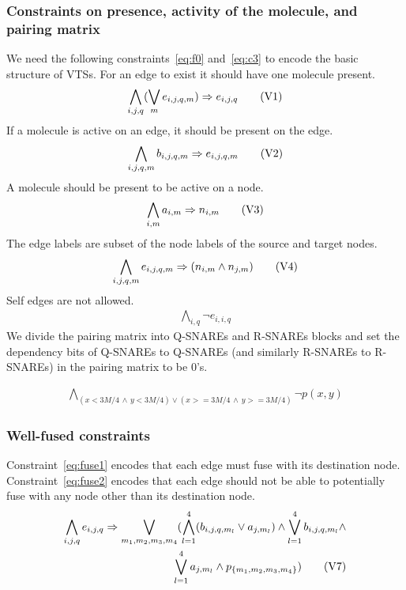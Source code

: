 \subsubsection{Constraints on presence, activity of the molecule, and pairing matrix}
%
We need the following constraints~\eqref{eq:f0} and~\eqref{eq:c3}
to encode the basic structure of VTSs.
%
For an edge to exist it should have one molecule present. 
%
\begin{align}
  \bigwedge\limits_{i,j,q} (\bigvee_m e_{i,j,q,m} )\Rightarrow e_{i,j,q}\tag{V1}\label{eq:f0}
\end{align}
If a molecule is active on an edge, it should be present on the edge.
%
\begin{align}
  \bigwedge\limits_{i,j,q,m} b_{i,j,q,m} \Rightarrow e_{i,j,q,m}\tag{V2}\label{eq:f1}
\end{align}
A molecule should be present to be active on a node.  
\begin{align}
  \bigwedge\limits_{i,m} a_{i,m} \Rightarrow n_{i,m}
  \tag{V3}\label{eq:c4}
\end{align}
The edge labels are subset of the node labels of the source and target nodes.
\begin{align}
  \bigwedge\limits_{i,j,q,m} e_{i,j,q,m} \Rightarrow (n_{i,m} \land n_{j,m} )\tag{V4}\label{eq:c0}
\end{align}
Self edges are not allowed. 
\begin{align}
   \bigwedge\limits_{i,q} \neg e_{i,i,q}\tag{V5}\label{eq:c2}
\end{align}
We divide the pairing matrix into Q-SNAREs and R-SNAREs blocks and set the dependency bits of Q-SNAREs to Q-SNAREs (and similarly R-SNAREs to R-SNAREs) in the pairing matrix to be 0's.

\begin{align}
  \bigwedge\limits_{(x < 3M/4 \, \land  \, y < 3M/4) \lor  (x >= 3M/4 \, \land \, y >= 3M/4)} \neg p(x,y)
  \tag{V6}\label{eq:c3}
\end{align}

\subsubsection{Well-fused constraints}
Constraint~\eqref{eq:fuse1} encodes that each edge must fuse with
its destination node.
%
Constraint~\eqref{eq:fuse2} encodes that each edge should not
be able to potentially fuse with any node other than its destination node.
\begin{align}
  \bigwedge\limits_{i,j,q} e_{i,j,q} \Rightarrow 
\bigvee_{{m_1,m_2,m_3,m_4}} (\bigwedge_{l=1}^4 ( b_{i,j,q,m_l} \lor a_{j,m_l} ) \land
\bigvee\limits_{l=1}^4 b_{i,j,q,m_l} \land
  \notag\\	
	\bigvee\limits_{l=1}^4 a_{j,m_l} \land p_{\{m_1,m_2,m_3,m_4\}})
  \tag{V7}\label{eq:fuse1}  
\end{align}

